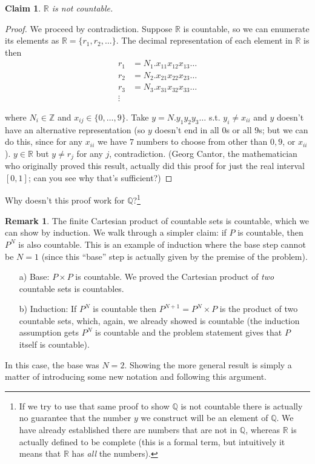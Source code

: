 \documentclass{article}
\newcommand{\R}{\mathbb{R}}
\newcommand{\Q}{\mathbb{Q}}
\newcommand{\Z}{\mathbb{Z}}
\newtheorem{claim}{Claim}
\theoremstyle{definition}
\newtheorem{remark}{Remark}
\begin{document}
\begin{claim}
    $\R$ is not countable. 
\end{claim}
\begin{proof}
    We proceed by contradiction. Suppose $\R$ is countable, so we can enumerate its elements as $\R = \{r_1, r_2, \ldots\}$. The decimal representation of each element in $\R$ is then
  \begin{align*}
    r_1 & = N_1.x_{11}x_{12}x_{13}\ldots \\
    r_2 & = N_2.x_{21}x_{22}x_{23}\ldots \\
    r_3 & = N_3.x_{31}x_{32}x_{33}\ldots \\
    \vdots
  \end{align*}

  where $N_i \in \Z$ and $x_{ij} \in \{0, \ldots, 9\}$. Take $y = N.y_1y_2y_3\ldots$ s.t. $y_i \neq x_{ii}$ and $y$ doesn't have an alternative representation (so $y$ doesn't end in all $0$s or all $9$s; but we can do this, since for any $x_{ii}$ we have $7$ numbers to choose from other than $0, 9$, or $x_{ii}$). $y \in \R$ but $y \neq r_j$ for any $j$, contradiction. (Georg Cantor, the mathematician who originally proved this result, actually did this proof for just the real interval $[0, 1]$; can you see why that's sufficient?)
\end{proof}

Why doesn't this proof work for $\Q$?\footnote{If we try to use that same proof to show $\Q$ is not countable there is actually no guarantee that the number $y$ we construct will be an element of $\Q$. We have already established there are numbers that are not in $\Q$, whereas $\R$ is actually defined to be complete (this is a formal term, but intuitively it means that $\R$ has \textit{all} the numbers).}

\begin{remark}
  The finite Cartesian product of countable sets is countable, which we can show by induction. We walk through a simpler claim: if $P$ is countable, then $P^N$ is also countable. This is an example of induction where the base step cannot be $N = 1$ (since this ``base'' step is actually given by the premise of the problem).
  \begin{enumerate}
    \item[a)] Base: $P \times P$ is countable. We proved the Cartesian product of \textit{two} countable sets is countables.

    \item[b)] Induction: If $P^N$ is countable then $P^{N + 1} = P^N \times P$ is the product of two countable sets, which, again, we already showed is countable (the induction assumption gets $P^N$ is countable and the problem statement gives that $P$ itself is countable).
  \end{enumerate}

  In this case, the base was $N = 2$. Showing the more general result is simply a matter of introducing some new notation and following this argument. 
\end{remark}
\end{document}
